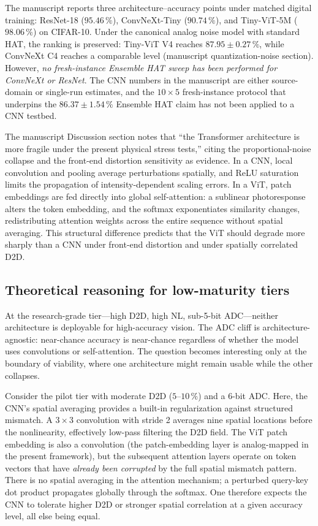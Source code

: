The manuscript reports three architecture--accuracy points under matched digital training: ResNet-18 ($95.46\,\%$), ConvNeXt-Tiny ($90.74\,\%$), and Tiny-ViT-5M ($98.06\,\%$) on CIFAR-10.  Under the canonical analog noise model with standard HAT, the ranking is preserved: Tiny-ViT V4 reaches $87.95\pm0.27\,\%$, while ConvNeXt C4 reaches a comparable level (manuscript quantization-noise section).  However, \emph{no fresh-instance Ensemble HAT sweep has been performed for ConvNeXt or ResNet}.  The CNN numbers in the manuscript are either source-domain or single-run estimates, and the $10 \times 5$ fresh-instance protocol that underpins the $86.37\pm1.54\,\%$ Ensemble HAT claim has not been applied to a CNN testbed.

The manuscript Discussion section notes that ``the Transformer architecture is more fragile under the present physical stress tests,'' citing the proportional-noise collapse and the front-end distortion sensitivity as evidence.  In a CNN, local convolution and pooling average perturbations spatially, and ReLU saturation limits the propagation of intensity-dependent scaling errors.  In a ViT, patch embeddings are fed directly into global self-attention: a sublinear photoresponse alters the token embedding, and the softmax exponentiates similarity changes, redistributing attention weights across the entire sequence without spatial averaging.  This structural difference predicts that the ViT should degrade more sharply than a CNN under front-end distortion and under spatially correlated D2D.

\subsection{Theoretical reasoning for low-maturity tiers}

At the research-grade tier---high D2D, high NL, sub-5-bit ADC---neither architecture is deployable for high-accuracy vision.  The ADC cliff is architecture-agnostic: near-chance accuracy is near-chance regardless of whether the model uses convolutions or self-attention.  The question becomes interesting only at the boundary of viability, where one architecture might remain usable while the other collapses.

Consider the pilot tier with moderate D2D ($5$--$10\,\%$) and a 6-bit ADC.  Here, the CNN's spatial averaging provides a built-in regularization against structured mismatch.  A $3 \times 3$ convolution with stride 2 averages nine spatial locations before the nonlinearity, effectively low-pass filtering the D2D field.  The ViT patch embedding is also a convolution (the patch-embedding layer is analog-mapped in the present framework), but the subsequent attention layers operate on token vectors that have \emph{already been corrupted} by the full spatial mismatch pattern.  There is no spatial averaging in the attention mechanism; a perturbed query-key dot product propagates globally through the softmax.  One therefore expects the CNN to tolerate higher D2D or stronger spatial correlation at a given accuracy level, all else being equal.

